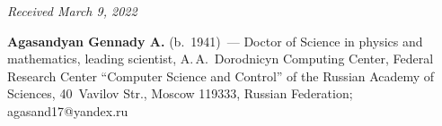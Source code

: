 \vspace*{-6pt}

\hfill{\small\textit{Received March 9, 2022}}

  
  \Contrl
  
  \noindent
  \textbf{Agasandyan Gennady A.} (b.\ 1941)~--- Doctor of Science in physics and 
mathematics, leading scientist, A.\,A.~Dorodnicyn Computing Center, Federal 
Research Center ``Computer Science and Control'' of the Russian Academy of 
Sciences, 40~Vavilov Str., Moscow 119333, Russian Federation; 
\mbox{agasand17@yandex.ru}
  

   
\label{end\stat}

\renewcommand{\bibname}{\protect\rm Литература} 
   